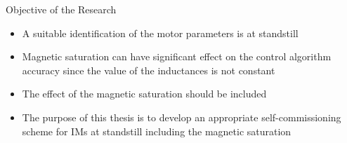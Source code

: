 \documentclass[11pt,aspectratio=169]{beamer}
\begin{document}

\begin{frame}{Objective of the Research}
\begin{itemize}
    \item A suitable identification of the motor parameters is at standstill
    \item Magnetic saturation can have significant effect on the control algorithm accuracy since the value of the inductances is not constant
    \item The effect of the magnetic saturation should be included

\item The purpose of this thesis is to develop an appropriate self-commissioning scheme for IMs at standstill including the magnetic saturation

\end{itemize}
    
\end{frame}
\end{document}

